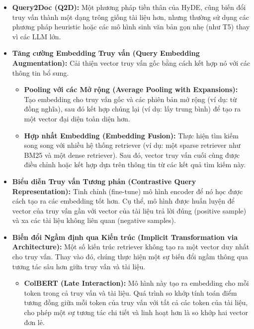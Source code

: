 \begin{itemize}
\begin{itemize}
\begin{itemize}
            \item \textbf{Query2Doc (Q2D):} 
            Một phương pháp tiền thân của HyDE, cũng biến đổi truy vấn thành một dạng trông giống tài liệu hơn, nhưng thường sử dụng các phương pháp heuristic hoặc các mô hình sinh văn bản gọn nhẹ (như T5) thay vì các LLM lớn.
            
            \item \textbf{Tăng cường Embedding Truy vấn (Query Embedding Augmentation):} 
            Cải thiện vector truy vấn gốc bằng cách kết hợp nó với các thông tin bổ sung.
            \begin{itemize}
                \item \textbf{Pooling với các Mở rộng (Average Pooling with Expansions):} 
                Tạo embedding cho truy vấn gốc và các phiên bản mở rộng (ví dụ: từ đồng nghĩa), sau đó kết hợp chúng lại (ví dụ: lấy trung bình) để tạo ra một vector đại diện toàn diện hơn.
                \item \textbf{Hợp nhất Embedding (Embedding Fusion):} 
                Thực hiện tìm kiếm song song với nhiều hệ thống retriever (ví dụ: một sparse retriever như BM25 và một dense retriever). Sau đó, vector truy vấn cuối cùng được điều chỉnh hoặc kết hợp dựa trên thông tin từ các kết quả tìm kiếm này.
            \end{itemize}
            
            \item \textbf{Biểu diễn Truy vấn Tương phản (Contrastive Query Representation):} 
            Tinh chỉnh (fine-tune) mô hình encoder để nó học được cách tạo ra các embedding tốt hơn. Cụ thể, mô hình được huấn luyện để vector của truy vấn gần với vector của tài liệu trả lời đúng (positive sample) và xa các tài liệu không liên quan (negative samples).
            
            \item \textbf{Biến đổi Ngầm định qua Kiến trúc (Implicit Transformation via Architecture):} 
            Một số kiến trúc retriever không tạo ra một vector duy nhất cho truy vấn. Thay vào đó, chúng thực hiện một sự biến đổi ngầm thông qua tương tác sâu hơn giữa truy vấn và tài liệu.
            \begin{itemize}
                \item \textbf{ColBERT (Late Interaction):} 
                Mô hình này tạo ra embedding cho mỗi token trong cả truy vấn và tài liệu. Quá trình so khớp tính toán điểm tương đồng giữa mỗi token của truy vấn với tất cả các token của tài liệu, cho phép một sự tương tác chi tiết và linh hoạt hơn là so khớp hai vector đơn lẻ.
            \end{itemize}
        \end{itemize}
    

\end{itemize}
\end{itemize}
